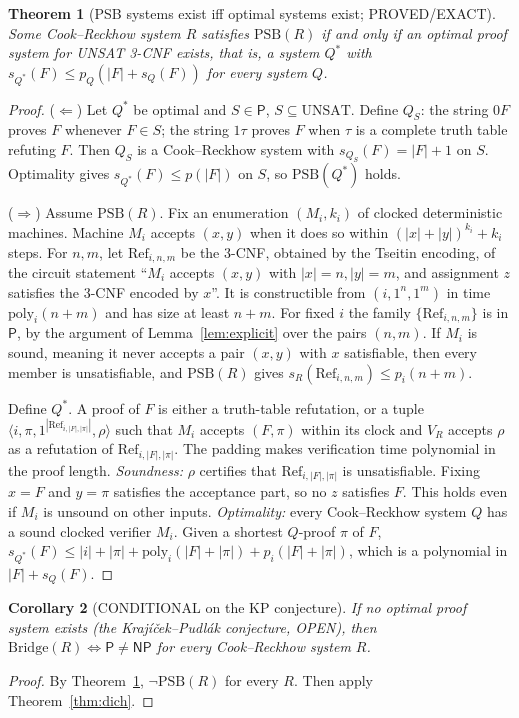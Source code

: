 \documentclass[11pt]{article}
\newtheorem{theorem}{Theorem}
\newtheorem{corollary}[theorem]{Corollary}
\theoremstyle{definition}
\newcommand{\UNSAT}{\mathrm{UNSAT}}
\newcommand{\Pc}{\mathsf{P}}
\newcommand{\NP}{\mathsf{NP}}
\newcommand{\PSB}{\mathrm{PSB}}
\newcommand{\Bridge}{\mathrm{Bridge}}
\begin{document}
\begin{theorem}[PSB systems exist iff optimal systems exist; PROVED/EXACT]\label{thm:opt}
Some Cook--Reckhow system $R$ satisfies $\PSB(R)$ if and only if an optimal
proof system for UNSAT 3-CNF exists, that is, a system $Q^\ast$ with
$s_{Q^\ast}(F)\le p_Q(|F|+s_Q(F))$ for every system $Q$.
\end{theorem}
\begin{proof}
($\Leftarrow$) Let $Q^\ast$ be optimal and $S\in\Pc$, $S\subseteq\UNSAT$.
Define $Q_S$: the string $0F$ proves $F$ whenever $F\in S$; the string $1\tau$
proves $F$ when $\tau$ is a complete truth table refuting $F$. Then $Q_S$ is a
Cook--Reckhow system with $s_{Q_S}(F)=|F|+1$ on $S$. Optimality gives
$s_{Q^\ast}(F)\le p(|F|)$ on $S$, so $\PSB(Q^\ast)$ holds.

($\Rightarrow$) Assume $\PSB(R)$. Fix an enumeration $(M_i,k_i)$ of clocked
deterministic machines. Machine $M_i$ accepts $(x,y)$ when it does so within
$(|x|+|y|)^{k_i}+k_i$ steps. For $n,m$, let $\mathrm{Ref}_{i,n,m}$ be the
3-CNF, obtained by the Tseitin encoding, of the circuit statement
``$M_i$ accepts $(x,y)$ with $|x|=n,|y|=m$, and assignment $z$ satisfies the
3-CNF encoded by $x$''. It is constructible from $(i,1^n,1^m)$ in time
$\mathrm{poly}_i(n+m)$ and has size at least $n+m$. For fixed $i$ the family
$\{\mathrm{Ref}_{i,n,m}\}$ is in $\Pc$, by the argument of
Lemma~\ref{lem:explicit} over the pairs $(n,m)$. If $M_i$ is sound, meaning it
never accepts a pair $(x,y)$ with $x$ satisfiable, then every member is
unsatisfiable, and $\PSB(R)$ gives
$s_R(\mathrm{Ref}_{i,n,m})\le p_i(n+m)$.

Define $Q^\ast$. A proof of $F$ is either a truth-table refutation, or a tuple
$\langle i,\pi,1^{|\mathrm{Ref}_{i,|F|,|\pi|}|},\rho\rangle$ such that
$M_i$ accepts $(F,\pi)$ within its clock and $V_R$ accepts $\rho$ as a
refutation of $\mathrm{Ref}_{i,|F|,|\pi|}$. The padding makes verification time
polynomial in the proof length.
\emph{Soundness:} $\rho$ certifies that $\mathrm{Ref}_{i,|F|,|\pi|}$ is
unsatisfiable. Fixing $x=F$ and $y=\pi$ satisfies the acceptance part, so no
$z$ satisfies $F$. This holds even if $M_i$ is unsound on other inputs.
\emph{Optimality:} every Cook--Reckhow system $Q$ has a sound clocked verifier
$M_i$. Given a shortest $Q$-proof $\pi$ of $F$,
$s_{Q^\ast}(F)\le |i|+|\pi|+\mathrm{poly}_i(|F|+|\pi|)+p_i(|F|+|\pi|)$,
which is a polynomial in $|F|+s_Q(F)$.
\end{proof}

\begin{corollary}[CONDITIONAL on the KP conjecture]\label{cor:kp}
If no optimal proof system exists (the Krajíček--Pudlák conjecture, OPEN), then
$\Bridge(R)\iff\Pc\ne\NP$ for \emph{every} Cook--Reckhow system $R$.
\end{corollary}
\begin{proof}
By Theorem~\ref{thm:opt}, $\neg\PSB(R)$ for every $R$. Then apply
Theorem~\ref{thm:dich}.
\end{proof}
\end{document}
